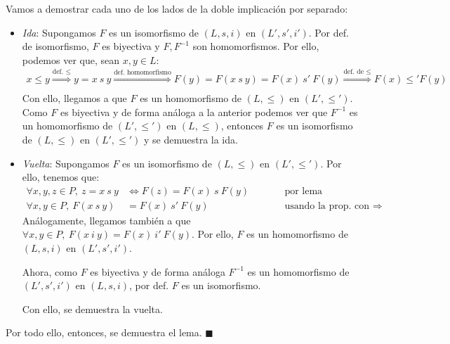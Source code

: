 \documentclass{article}
\begin{document}
\vspace{0.5cm}
Vamos a demostrar cada uno de los lados de la doble implicación por separado:
\begin{itemize}
  \item \textit{Ida}: Supongamos $F$ es un isomorfismo de $(L,s,i)$ en $(L',s',i')$. Por def. de isomorfismo, $F$ es biyectiva y $F,F^{-1}$ son homomorfismos. Por ello, podemos ver que, sean $x,y\in L$:
        \begin{equation*}
          \begin{aligned}
            x\leq y\overset{\text{def. }\leq}{\Rightarrow}y=x\ s\ y\overset{\text{def. homomorfismo}}{\Rightarrow}F(y)=F(x\ s\ y)=F(x)\ s'\ F(y)\overset{\text{def. de }\leq}{\Rightarrow}F(x)\leq' F(y) \\
          \end{aligned}
        \end{equation*}
        Con ello, llegamos a que $F$ es un homomorfismo de $(L,\leq)$ en $(L',\leq')$. Como $F$ es biyectiva y de forma análoga a la anterior podemos ver que $F^{-1}$ es un homomorfismo de $(L',\leq')$ en $(L,\leq)$, entonces $F$ es un isomorfismo de $(L,\leq)$ en $(L',\leq')$ y se demuestra la ida.
  \item \textit{Vuelta}: Supongamos $F$ es un isomorfismo de $(L,\leq)$ en $(L',\leq')$. Por ello, tenemos que:
        \begin{equation*}
          \begin{alignedat}{2}
            \forall x,y,z\in P,\ z=x\ s\ y & \iff F(z)=F(x)\ s\ F(y) &  & \qquad\text{por lema}                        \\
            \forall x,y\in P,\ F(x\ s\ y)  & =F(x)\ s'\ F(y)         &  & \qquad\text{usando la prop. con }\Rightarrow
          \end{alignedat}
        \end{equation*}
        Análogamente, llegamos también a que $\forall x,y\in P,\ F(x\ i\ y) = F(x)\ i'\ F(y)$. Por ello, $F$ es un homomorfismo de $(L,s,i)$ en $(L',s',i')$.

        Ahora, como $F$ es biyectiva y de forma análoga $F^{-1}$ es un homomorfismo de $(L',s',i')$ en $(L,s,i)$, por def. $F$ es un isomorfismo.

        Con ello, se demuestra la vuelta.
\end{itemize}

Por todo ello, entonces, se demuestra el lema. $\blacksquare$
\end{document}
